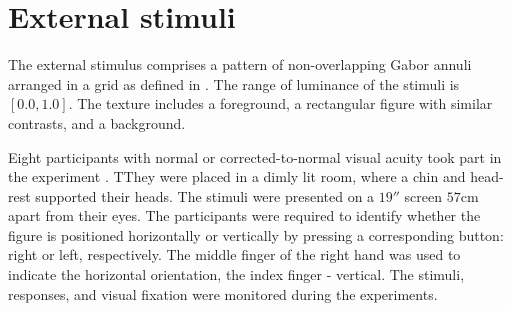 \section{External stimuli}
\label{sec:external-stimuli}

The external stimulus comprises a pattern of non-overlapping Gabor annuli arranged in a grid as defined in \cite{MaryamPLACEHOLDER}. The range of luminance of the stimuli is $[0.0, 1.0]$. The texture includes a foreground, a rectangular figure with similar contrasts, and a background.

Eight participants with normal or corrected-to-normal visual acuity took part in the experiment \cite{MaryamPLACEHOLDER}. TThey were placed in a dimly lit room, where a chin and head-rest supported their heads. The stimuli were presented on a $19''$ screen $57$cm apart from their eyes. The participants were required to identify whether the figure is positioned horizontally or vertically by pressing a corresponding button: right or left, respectively. The middle finger of the right hand was used to indicate the horizontal orientation, the index finger - vertical.  The stimuli, responses, and visual fixation were monitored during the experiments.

